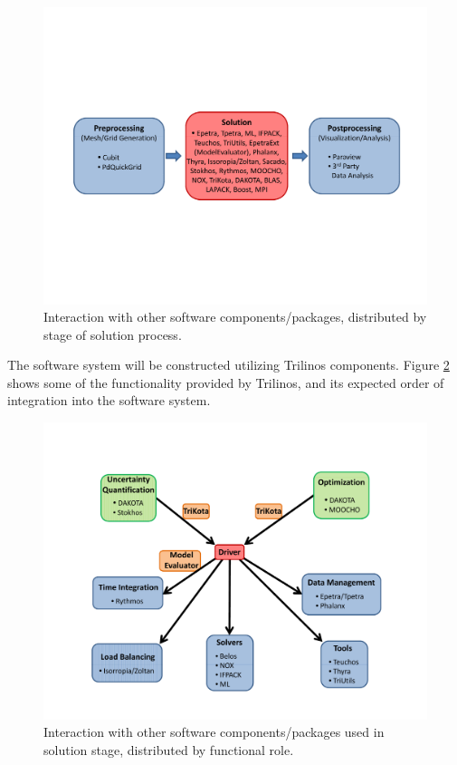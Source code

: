 \documentclass[10pt]{article}
\theoremstyle{plain}
\theoremstyle{definition}
\begin{document}
\begin{figure}[h!]
  \begin{center}
   \includegraphics[scale=0.5]{PrePost}
   \end{center}
  \caption{Interaction with other software components/packages, distributed by stage of solution process.}
  \label{fig:PrePost}
\end{figure}

The software system will be constructed utilizing Trilinos components. Figure \ref{fig:TrilinosComponents} shows some of the functionality provided by Trilinos, and its expected order of integration into the software system.
\begin{figure}[h!]
  \begin{center}
   \includegraphics[scale=0.6]{TrilinosComponents}
   \end{center}
  \caption{Interaction with other software components/packages used in solution stage, distributed by functional role.}
  \label{fig:TrilinosComponents}
\end{figure}
\end{document}
